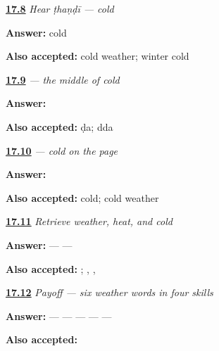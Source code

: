 \noindent\begin{minipage}[t]{\linewidth}
\raggedright
\hyperlink{review-MW-C12-hear-thandi-meaning}{\textbf{17.8}} \emph{Hear \emph{ṭhaṇḍī} — cold}\par
\small \textbf{Answer:} cold\par
\footnotesize \textbf{Also accepted:} cold weather; winter cold
\end{minipage}\par\medskip

\noindent\begin{minipage}[t]{\linewidth}
\raggedright
\hyperlink{review-MW-W12-dda-write}{\textbf{17.9}} \emph{ — the middle of cold}\par
\small \textbf{Answer:} \par
\footnotesize \textbf{Also accepted:}  ḍa;  dda
\end{minipage}\par\medskip

\noindent\begin{minipage}[t]{\linewidth}
\raggedright
\hyperlink{review-MW-C12-thandi-dictation}{\textbf{17.10}} \emph{ — cold on the page}\par
\small \textbf{Answer:} \par
\footnotesize \textbf{Also accepted:}  cold;  cold weather
\end{minipage}\par\medskip

\noindent\begin{minipage}[t]{\linewidth}
\raggedright
\hyperlink{review-MW-R12-weather-new-three-recall}{\textbf{17.11}} \emph{Retrieve weather, heat, and cold}\par
\small \textbf{Answer:}  —  — \par
\footnotesize \textbf{Also accepted:}   ; , , 
\end{minipage}\par\medskip

\noindent\begin{minipage}[t]{\linewidth}
\raggedright
\hyperlink{review-MW-C12-weather-six-payoff}{\textbf{17.12}} \emph{Payoff — six weather words in four skills}\par
\small \textbf{Answer:}  —  —  —  —  — \par
\footnotesize \textbf{Also accepted:}      
\end{minipage}\par\medskip

